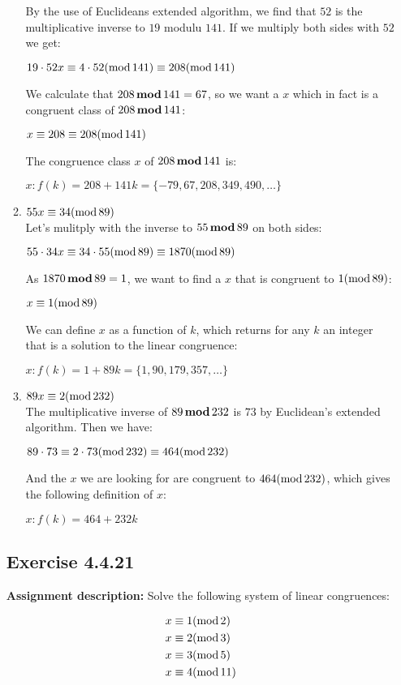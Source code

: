 \documentclass{report}
\newcommand{\cent}[1]{\begin{center}#1\end{center}}
\newcommand{\mAlign}[1]{\begin{align*}#1\end{align*}}
\newcommand{\AssignmentDescription}{\textbf{Assignment description: }}
\newcommand{\Exercise}[1]{\subsection{Exercise #1}}
\newcommand{\defaultEnumerateLabel}{\textbf{\alph*.}}
\newcommand{\modInline}{\text{mod\,}}
\newcommand{\modFunc}{\text{\,\textbf{mod}\,}}
\newcommand{\MyItem}[1]{\item #1\\}
\begin{document}
\begin{enumerate}[label=\defaultEnumerateLabel]
\begin{enumerate}[label=\defaultEnumerateLabel]
		By the use of Euclideans extended algorithm, we find that $52$ is the multiplicative inverse to $19$ modulu $141$. If we multiply both sides with $52$ we get:
		
		\cent{$19 \cdot 52x \equiv 4 \cdot 52 (\modInline 141) \equiv 208 (\modInline 141)$}
		
		We calculate that $208 \modFunc 141 = 67$, so we want a $x$ which in fact is a congruent class of $208 \modFunc 141$:
		
		\cent{$x \equiv 208 \equiv 208 (\modInline 141)$}
		
		The congruence class $x$ of $208 \modFunc 141$ is:
		
		\cent{$x : f(k) = 208 + 141k = \{-79,67,208,349,490,\dots\}$}
		
		\MyItem{$55x \equiv 34 (\modInline 89)$}
		
		Let's mulitply with the inverse to $55 \modFunc 89$ on both sides:
		
		\cent{$55 \cdot 34x \equiv 34 \cdot 55 (\modInline 89) \equiv 1870 (\modInline 89)$}
		
		As $1870 \modFunc 89 = 1$, we want to find a $x$ that is congruent to $1 (\modInline 89)$:
		
		\cent{$x \equiv 1 (\modInline 89)$}
		
		We can define $x$ as a function of $k$, which returns for any $k$ an integer that is a solution to the linear congruence:
		
		\cent{$x : f(k) = 1 +89k = \{1,90,179,357,\dots\}$}
		
		\MyItem{$89x \equiv 2 (\modInline 232)$}
		
		The multiplicative inverse of $89 \modFunc 232$ is $73$ by Euclidean's extended algorithm. Then we have:
		
		\cent{$89 \cdot 73 \equiv 2 \cdot 73 (\modInline 232) \equiv 464 (\modInline 232)$}
		
		And the $x$ we are looking for are congruent to $ 464 (\modInline 232) $, which gives the following definition of $x$:
		
		\cent{$x :  f(k) = 464 + 232k$}
		
	\end{enumerate}
	\Exercise{4.4.21}
	
	\AssignmentDescription
	Solve the following system of linear congruences:
	
	\mAlign{
		x &\equiv 1 (\modInline 2) \\
		x &\equiv 2 (\modInline 3) \\
		x &\equiv 3 (\modInline 5) \\
		x &\equiv 4 (\modInline 11)
	}
	

\end{enumerate}
\end{document}
